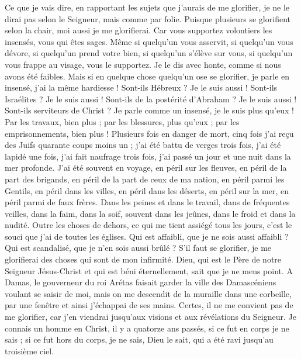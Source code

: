 \begin{multicols}{2}
Ce que je vais dire, en rapportant les sujets que j'aurais de me glorifier, je ne le dirai pas selon le Seigneur, mais comme par folie.
Puisque plusieurs se glorifient selon la chair, moi aussi je me glorifierai.
Car vous supportez volontiers les insensés, vous qui êtes sages.
Même si quelqu'un vous asservit, si quelqu'un vous dévore, si quelqu'un prend votre bien, si quelqu'un s'élève sur vous, si quelqu'un vous frappe au visage, vous le supportez.
Je le dis avec honte, comme si nous avons été faibles. Mais si en quelque chose quelqu'un ose se glorifier, je parle en insensé, j'ai la même hardiesse !
Sont-ils Hébreux ? Je le suis aussi ! Sont-ils Israélites ? Je le suis aussi ! Sont-ils de la postérité d'Abraham ? Je le suis aussi !
Sont-ils serviteurs de Christ ? Je parle comme un insensé, je le suis plus qu'eux ! Par les travaux, bien plus ; par les blessures, plus qu'eux ; par les emprisonnements, bien plus ! Plusieurs fois en danger de mort,
cinq fois j'ai reçu des Juifs quarante coups moins un ;
j'ai été battu de verges trois fois, j'ai été lapidé une fois, j'ai fait naufrage trois fois, j'ai passé un jour et une nuit dans la mer profonde.
J'ai été souvent en voyage, en péril sur les fleuves, en péril de la part des brigands, en péril de la part de ceux de ma nation, en péril parmi les Gentils, en péril dans les villes, en péril dans les déserts, en péril sur la mer, en péril parmi de faux frères.
Dans les peines et dans le travail, dans de fréquentes veilles, dans la faim, dans la soif, souvent dans les jeûnes, dans le froid et dans la nudité.
Outre les choses de dehors, ce qui me tient assiégé tous les jours, c'est le souci que j'ai de toutes les églises.
Qui est affaibli, que je ne sois aussi affaibli ? Qui est scandalisé, que je n'en sois aussi brûlé ?
S'il faut se glorifier, je me glorifierai des choses qui sont de mon infirmité.
Dieu, qui est le Père de notre Seigneur Jésus-Christ et qui est béni éternellement, sait que je ne mens point.
A Damas, le gouverneur du roi Arétas faisait garder la ville des Damascéniens voulant se saisir de moi,
mais on me descendit de la muraille dans une corbeille, par une fenêtre et ainsi j'échappai de ses mains.
\VerseOne{}Certes, il ne me convient pas de me glorifier, car j'en viendrai jusqu'aux visions et aux révélations du Seigneur.
Je connais un homme en Christ, il y a quatorze ans passés, si ce fut en corps je ne sais ; si ce fut hors du corps, je ne sais, Dieu le sait, qui a été ravi jusqu'au troisième ciel.

\end{multicols}

